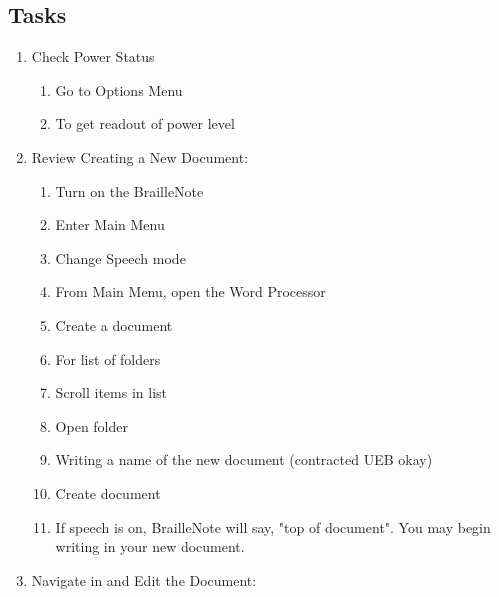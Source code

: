 \documentclass[10pt,letterpaper,twoside]{report}
\begin{document}
\subsection{Tasks}
\begin{enumerate}
	\item Check Power Status
	      \begin{enumerate}
		      \item Go to Options Menu 
		      \item To get readout of power level 
	      \end{enumerate}
	\item Review Creating a New Document:
	      \begin{enumerate}
		      \item Turn on the BrailleNote 
		      \item Enter Main Menu 
		      \item Change Speech mode 
		      \item From Main Menu, open the Word Processor 
		      \item Create a document 
		      \item For list of folders 
		      \item Scroll items in list 
		      \item Open folder 
		      \item Writing a name of the new document (contracted UEB okay)
		      \item Create document 
		      \item If speech is on, BrailleNote will say, "top of document". You may begin writing in your new document.
	      \end{enumerate}
	\item Navigate in and Edit the Document:
	      \begin{enumerate}

\end{enumerate}
\end{enumerate}
\end{document}
